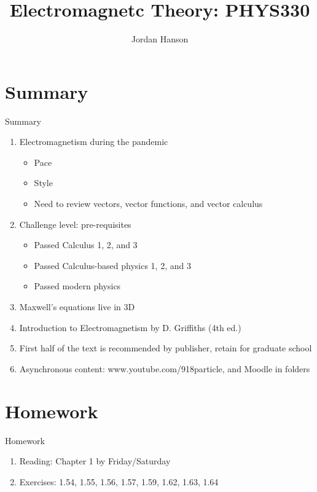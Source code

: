 \documentclass{beamer}
\title{Electromagnetc Theory: PHYS330}
\author{Jordan Hanson}
\institute{Whittier College Department of Physics and Astronomy}
\begin{document}
\maketitle

\section{Summary}

\begin{frame}{Summary}
\begin{enumerate}
\item Electromagnetism during the pandemic
\begin{itemize}
\item Pace
\item Style
\item Need to review vectors, vector functions, and vector calculus
\end{itemize}
\item Challenge level: pre-requisites
\begin{itemize}
\item Passed Calculus 1, 2, and 3
\item Passed Calculus-based physics 1, 2, and 3
\item Passed modern physics
\end{itemize}
\item Maxwell's equations live in 3D
\item \alert{Introduction to Electromagnetism by D. Griffiths (4th ed.)}
\item First half of the text is recommended by publisher, retain for graduate school
\item Asynchronous content: www.youtube.com/918particle, and Moodle in folders
\end{enumerate}
\end{frame}

\section{Homework}

\begin{frame}{Homework}
\begin{enumerate}
\item Reading: Chapter 1 by Friday/Saturday
\item Exercises: 1.54, 1.55, 1.56, 1.57, 1.59, 1.62, 1.63, 1.64
\end{enumerate}
\end{frame}
\end{document}
